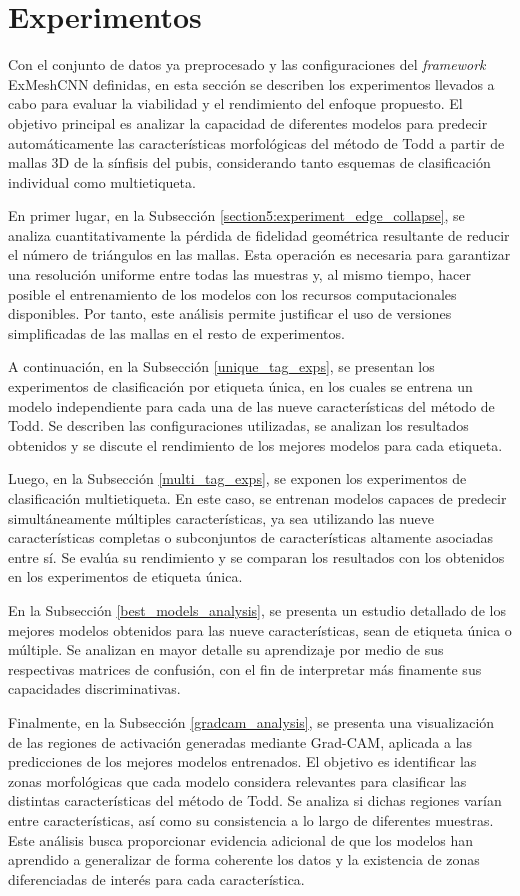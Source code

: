 \section{Experimentos}
Con el conjunto de datos ya preprocesado y las configuraciones del \textit{framework} ExMeshCNN definidas, en esta sección se describen los experimentos llevados a cabo para evaluar la viabilidad y el rendimiento del enfoque propuesto. El objetivo principal es analizar la capacidad de diferentes modelos para predecir automáticamente las características morfológicas del método de Todd a partir de mallas 3D de la sínfisis del pubis, considerando tanto esquemas de clasificación individual como multietiqueta.

En primer lugar, en la Subsección \ref{section5:experiment_edge_collapse}, se analiza cuantitativamente la pérdida de fidelidad geométrica resultante de reducir el número de triángulos en las mallas. Esta operación es necesaria para garantizar una resolución uniforme entre todas las muestras y, al mismo tiempo, hacer posible el entrenamiento de los modelos con los recursos computacionales disponibles. Por tanto, este análisis permite justificar el uso de versiones simplificadas de las mallas en el resto de experimentos.

A continuación, en la Subsección \ref{unique_tag_exps}, se presentan los experimentos de clasificación por etiqueta única, en los cuales se entrena un modelo independiente para cada una de las nueve características del método de Todd. Se describen las configuraciones utilizadas, se analizan los resultados obtenidos y se discute el rendimiento de los mejores modelos para cada etiqueta.

Luego, en la Subsección \ref{multi_tag_exps}, se exponen los experimentos de clasificación multietiqueta. En este caso, se entrenan modelos capaces de predecir simultáneamente múltiples características, ya sea utilizando las nueve características completas o subconjuntos de características altamente asociadas entre sí. Se evalúa su rendimiento y se comparan los resultados con los obtenidos en los experimentos de etiqueta única.

En la Subsección \ref{best_models_analysis}, se presenta un estudio detallado de los mejores modelos obtenidos para las nueve características, sean de etiqueta única o múltiple. Se analizan en mayor detalle su aprendizaje por medio de sus respectivas matrices de confusión, con el fin de interpretar más finamente sus capacidades discriminativas.

Finalmente, en la Subsección \ref{gradcam_analysis}, se presenta una visualización de las regiones de activación generadas mediante Grad-CAM, aplicada a las predicciones de los mejores modelos entrenados. El objetivo es identificar las zonas morfológicas que cada modelo considera relevantes para clasificar las distintas características del método de Todd. Se analiza si dichas regiones varían entre características, así como su consistencia a lo largo de diferentes muestras. Este análisis busca proporcionar evidencia adicional de que los modelos han aprendido a generalizar de forma coherente los datos y la existencia de zonas diferenciadas de interés para cada característica.

